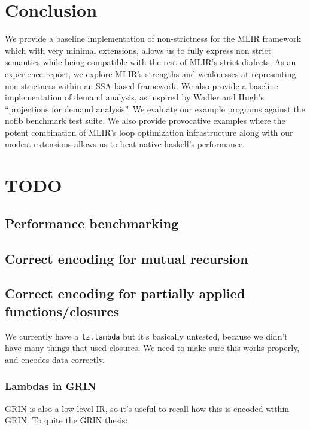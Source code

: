 \documentclass[sigplan,\review anonymous]{acmart}
\begin{document}
\section{Conclusion}

We provide a baseline implementation of non-strictness for the MLIR framework
which with very minimal extensions, allows us to fully express non strict semantics
while being compatible with the rest of MLIR's strict dialects.
As an experience report, we explore MLIR's strengths and weaknesses at representing
non-strictness within an SSA based framework. We also provide a baseline implementation
of demand analysis, as inspired by Wadler and Hugh's ``projections for demand
analysis''. We evaluate our example programs against the nofib benchmark test suite.
We also provide provocative examples where the potent combination of MLIR's 
loop optimization infrastructure along with our modest extensions allows us to
beat native haskell's performance.

\section{TODO}

\subsection{Performance benchmarking}
\subsection{Correct encoding for mutual recursion}
\subsection{Correct encoding for partially applied functions/closures}

We currently have a \texttt{lz.lambda} but it's basically untested, because
we didn't have many things that used closures. We need to make sure this
works properly, and encodes data correctly.

\subsubsection{Lambdas in GRIN}
GRIN is also a low level IR, so it's useful to recall how this is encoded
within GRIN. To quite the GRIN thesis:

\end{document}
